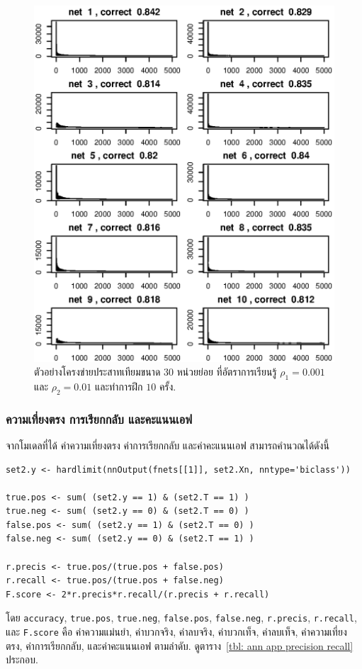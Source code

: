 %
\begin{figure}
\begin{center}
\includegraphics[width=5.5in]{04ANN/mammo3final1.eps}
\end{center}
\caption{ตัวอย่างโครงข่ายประสาทเทียมขนาด $30$ หน่วยย่อย ที่อัตราการเรียนรู้ $\rho_1 = 0.001$ และ $\rho_2 = 0.01$ และทำการฝึก $10$ ครั้ง.}
\label{fig: ann app final mamo}
\end{figure}
%

\subsubsection{ความเที่ยงตรง การเรียกกลับ และคะแนนเอฟ}

จากโมเดลที่ได้ ค่าความเที่ยงตรง ค่าการเรียกกลับ และค่าคะแนนเอฟ สามารถคำนวณได้ดังนี้
\begin{verbatim}
set2.y <- hardlimit(nnOutput(fnets[[1]], set2.Xn, nntype='biclass'))

true.pos <- sum( (set2.y == 1) & (set2.T == 1) )
true.neg <- sum( (set2.y == 0) & (set2.T == 0) )
false.pos <- sum( (set2.y == 1) & (set2.T == 0) )
false.neg <- sum( (set2.y == 0) & (set2.T == 1) )

r.precis <- true.pos/(true.pos + false.pos)
r.recall <- true.pos/(true.pos + false.neg)   
F.score <- 2*r.precis*r.recall/(r.precis + r.recall)
\end{verbatim}
โดย \texttt{accuracy}, \texttt{true.pos}, \texttt{true.neg}, \texttt{false.pos}, \texttt{false.neg}, \texttt{r.precis}, \texttt{r.recall}, และ \texttt{F.score} คือ ค่าความแม่นยำ, ค่าบวกจริง, ค่าลบจริง, ค่าบวกเท็จ, ค่าลบเท็จ, ค่าความเที่ยงตรง, ค่าการเรียกกลับ, และค่าคะแนนเอฟ ตามลำดับ.
ดูตาราง~\ref{tbl: ann app precision recall} ประกอบ.

